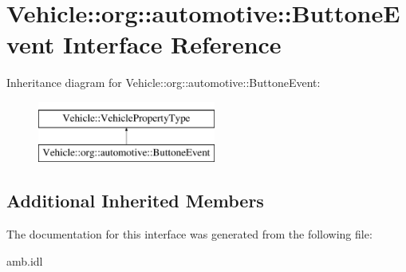 \hypertarget{interfaceVehicle_1_1org_1_1automotive_1_1ButtoneEvent}{\section{Vehicle\-:\-:org\-:\-:automotive\-:\-:Buttone\-Event Interface Reference}
\label{interfaceVehicle_1_1org_1_1automotive_1_1ButtoneEvent}
}
Inheritance diagram for Vehicle\-:\-:org\-:\-:automotive\-:\-:Buttone\-Event\-:\begin{figure}[H]
\begin{center}
\leavevmode
\includegraphics[height=2.000000cm]{interfaceVehicle_1_1org_1_1automotive_1_1ButtoneEvent}
\end{center}
\end{figure}
\subsection*{Additional Inherited Members}


The documentation for this interface was generated from the following file\-:\begin{DoxyCompactItemize}
\item 
amb.\-idl\end{DoxyCompactItemize}
